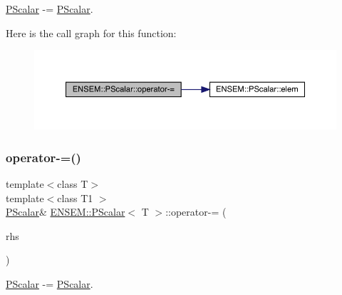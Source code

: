 \mbox{\hyperlink{classENSEM_1_1PScalar}{P\+Scalar}} -\/= \mbox{\hyperlink{classENSEM_1_1PScalar}{P\+Scalar}}. 

Here is the call graph for this function\+:
\nopagebreak
\begin{figure}[H]
\begin{center}
\leavevmode
\includegraphics[width=350pt]{d3/d27/classENSEM_1_1PScalar_a8c0e633dbd87bcb922496bfaf136752c_cgraph}
\end{center}
\end{figure}
\mbox{\label{classENSEM_1_1PScalar_a8c0e633dbd87bcb922496bfaf136752c}} 
\subsubsection{\texorpdfstring{operator-\/=()}{operator-=()}\hspace{0.1cm}{\footnotesize\ttfamily [2/2]}}
{\footnotesize\ttfamily template$<$class T$>$ \\
template$<$class T1 $>$ \\
\mbox{\hyperlink{classENSEM_1_1PScalar}{P\+Scalar}}\& \mbox{\hyperlink{classENSEM_1_1PScalar}{E\+N\+S\+E\+M\+::\+P\+Scalar}}$<$ T $>$\+::operator-\/= (\begin{DoxyParamCaption}\item[{const \mbox{\hyperlink{classENSEM_1_1PScalar}{P\+Scalar}}$<$ T1 $>$ \&}]{rhs }\end{DoxyParamCaption})\hspace{0.3cm}{\ttfamily [inline]}}



\mbox{\hyperlink{classENSEM_1_1PScalar}{P\+Scalar}} -\/= \mbox{\hyperlink{classENSEM_1_1PScalar}{P\+Scalar}}. 

